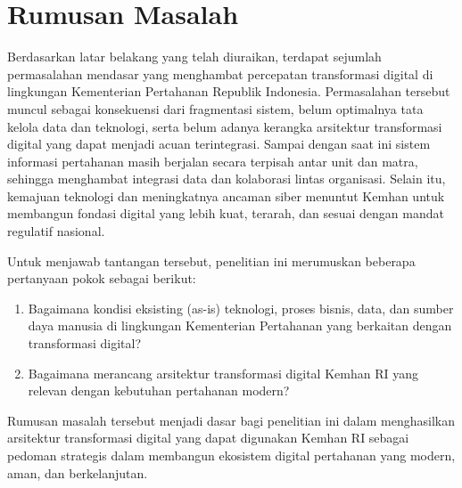 \section{Rumusan Masalah}
Berdasarkan latar belakang yang telah diuraikan, terdapat sejumlah permasalahan mendasar yang menghambat percepatan transformasi digital di lingkungan Kementerian Pertahanan Republik Indonesia.
Permasalahan tersebut muncul sebagai konsekuensi dari fragmentasi sistem, belum optimalnya tata kelola data dan teknologi, serta belum adanya kerangka arsitektur transformasi digital yang dapat menjadi acuan terintegrasi.
Sampai dengan saat ini sistem informasi pertahanan masih berjalan secara terpisah antar unit dan matra, sehingga menghambat integrasi data dan kolaborasi lintas organisasi.
Selain itu, kemajuan teknologi dan meningkatnya ancaman siber menuntut Kemhan untuk membangun fondasi digital yang lebih kuat, terarah, dan sesuai dengan mandat regulatif nasional.

Untuk menjawab tantangan tersebut, penelitian ini merumuskan beberapa pertanyaan pokok sebagai berikut:
\begin{enumerate}
\item	Bagaimana kondisi eksisting (as-is) teknologi, proses bisnis, data, dan sumber daya manusia di lingkungan Kementerian Pertahanan yang berkaitan dengan transformasi digital?
\item	Bagaimana merancang arsitektur transformasi digital Kemhan RI yang relevan dengan kebutuhan pertahanan modern?
\end{enumerate}
Rumusan masalah tersebut menjadi dasar bagi penelitian ini dalam menghasilkan arsitektur transformasi digital yang dapat digunakan Kemhan RI sebagai pedoman strategis dalam membangun ekosistem digital pertahanan yang modern, aman, dan berkelanjutan.

